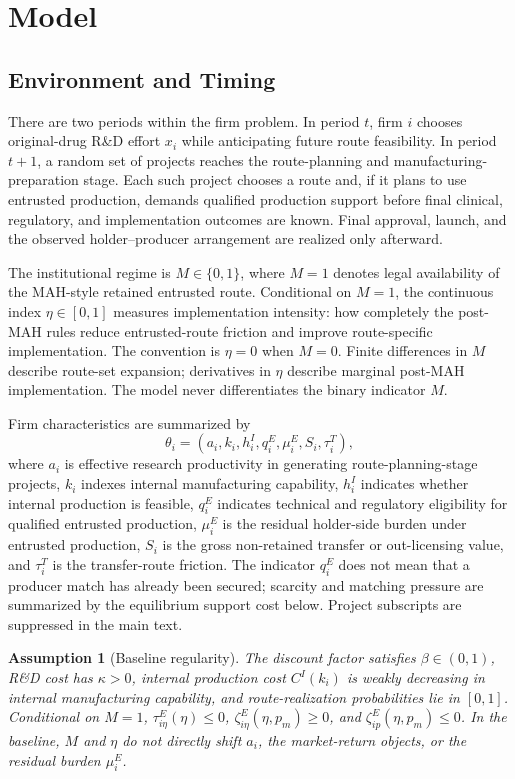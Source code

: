 \documentclass[12pt]{article}
\newtheorem{assumption}{Assumption}
\newcommand{\1}{\mathbf{1}}
\begin{document}
\section{Model}

\subsection{Environment and Timing}

There are two periods within the firm problem. In period $t$, firm $i$ chooses original-drug R\&D effort $x_i$ while anticipating future route feasibility. In period $t+1$, a random set of projects reaches the route-planning and manufacturing-preparation stage. Each such project chooses a route and, if it plans to use entrusted production, demands qualified production support before final clinical, regulatory, and implementation outcomes are known. Final approval, launch, and the observed holder--producer arrangement are realized only afterward.

The institutional regime is $M\in\{0,1\}$, where $M=1$ denotes legal availability of the MAH-style retained entrusted route. Conditional on $M=1$, the continuous index $\eta\in[0,1]$ measures implementation intensity: how completely the post-MAH rules reduce entrusted-route friction and improve route-specific implementation. The convention is $\eta=0$ when $M=0$. Finite differences in $M$ describe route-set expansion; derivatives in $\eta$ describe marginal post-MAH implementation. The model never differentiates the binary indicator $M$.

Firm characteristics are summarized by
\[
    \theta_i=(a_i,k_i,h_i^I,q_i^E,\mu_i^E,S_i,\tau_i^T),
\]
where $a_i$ is effective research productivity in generating route-planning-stage projects, $k_i$ indexes internal manufacturing capability, $h_i^I$ indicates whether internal production is feasible, $q_i^E$ indicates technical and regulatory eligibility for qualified entrusted production, $\mu_i^E$ is the residual holder-side burden under entrusted production, $S_i$ is the gross non-retained transfer or out-licensing value, and $\tau_i^T$ is the transfer-route friction. The indicator $q_i^E$ does not mean that a producer match has already been secured; scarcity and matching pressure are summarized by the equilibrium support cost below. Project subscripts are suppressed in the main text.

\begin{assumption}[Baseline regularity]
\label{ass:baseline_regular}
The discount factor satisfies $\beta\in(0,1)$, R\&D cost has $\kappa>0$, internal production cost $C^I(k_i)$ is weakly decreasing in internal manufacturing capability, and route-realization probabilities lie in $[0,1]$. Conditional on $M=1$, $\tau_{i\eta}^E(\eta)\le0$, $\zeta_{i\eta}^E(\eta,p_m)\ge0$, and $\zeta_{ip}^E(\eta,p_m)\le0$. In the baseline, $M$ and $\eta$ do not directly shift $a_i$, the market-return objects, or the residual burden $\mu_i^E$.
\end{assumption}
\end{document}

